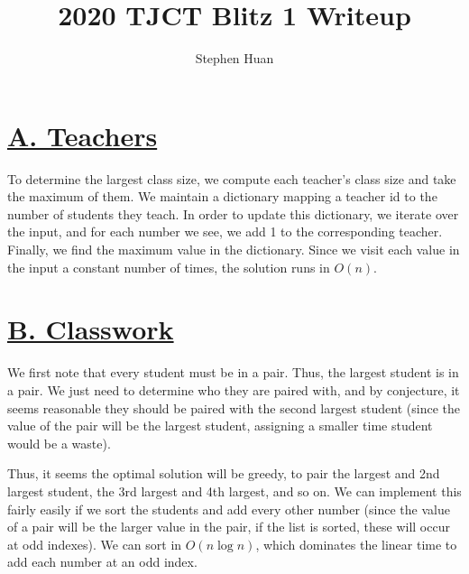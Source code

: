 \documentclass[11pt, oneside]{article}
\title{2020 TJCT Blitz 1 Writeup}
\author{Stephen Huan}
\theoremstyle{plain}
\theoremstyle{definition}
\begin{document}
\maketitle

\section{\href{https://codeforces.com/group/M4wsRWBHyZ/contest/299371/problem/A}
{A. Teachers}}
To determine the largest class size, we compute each teacher's class size
and take the maximum of them. We maintain a dictionary mapping a teacher id
to the number of students they teach. In order to update this dictionary,
we iterate over the input, and for each number we see, we add 1 to the
corresponding teacher. Finally, we find the maximum value in the dictionary.  
Since we visit each value in the input a constant number of times,
the solution runs in \( O(n) \).

\section{\href{https://codeforces.com/group/M4wsRWBHyZ/contest/299371/problem/B}
{B. Classwork}}
We first note that every student must be in a pair.
Thus, the largest student is in a pair. We just need to determine who they are
paired with, and by conjecture, it seems reasonable they should be paired with
the second largest student (since the value of the pair will be the largest 
student, assigning a smaller time student would be a waste).

Thus, it seems the optimal solution will be greedy, to pair the largest and
2nd largest student, the 3rd largest and 4th largest, and so on.
We can implement this fairly easily if we sort the students and add every
other number (since the value of a pair will be the larger value in the pair,
if the list is sorted, these will occur at odd indexes).
We can sort in \( O(n \log n) \), which dominates the linear time to 
add each number at an odd index. 
\end{document}
